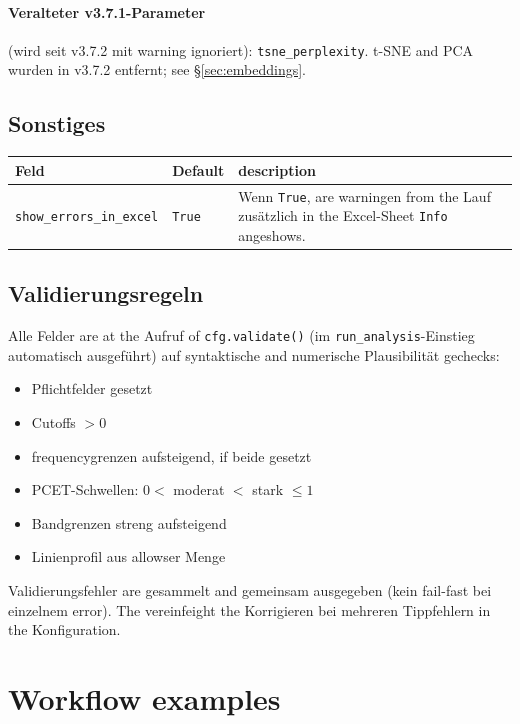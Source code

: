 \documentclass[11pt,a4paper,twoside]{article}
\theoremstyle{remark}
\begin{document}
\paragraph{Veralteter v3.7.1-Parameter} (wird seit v3.7.2 mit
warning ignoriert): \texttt{tsne\_perplexity}. t-SNE and PCA wurden
in v3.7.2 entfernt; see \S\ref{sec:embeddings}.

\subsection{Sonstiges}

\begin{longtable}{p{} p{} p{}}
\toprule
\textbf{Feld} & \textbf{Default} & \textbf{description} \\
\midrule
\endhead
\texttt{show\_errors\_in\_excel} & \texttt{True} & Wenn \texttt{True},
  are warningen from the Lauf zus\"atzlich in the Excel-Sheet
  \texttt{Info} angeshows. \\
\bottomrule
\end{longtable}

\subsection{Validierungsregeln}

Alle Felder are at the Aufruf of \texttt{cfg.validate()} (im
\texttt{run\_analysis}-Einstieg automatisch ausgef\"uhrt) auf
syntaktische and numerische Plausibilit\"at gechecks:

\begin{itemize}
  \item Pflichtfelder gesetzt
  \item Cutoffs $> 0$
  \item frequencygrenzen aufsteigend, if beide gesetzt
  \item PCET-Schwellen: $0 < $ moderat $< $ stark $\leq 1$
  \item Bandgrenzen streng aufsteigend
  \item Linienprofil aus allowser Menge
\end{itemize}

Validierungsfehler are gesammelt and gemeinsam ausgegeben (kein
fail-fast bei einzelnem error). The vereinfeight the Korrigieren bei
mehreren Tippfehlern in the Konfiguration.

\section{Workflow examples}
\label{sec:workflow}
\end{document}
